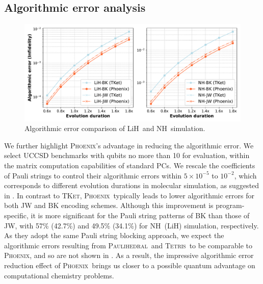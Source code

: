 \documentclass[conference,9pt]{IEEEtran}
\newcommand{\ZY}[1]{{\color{purple}[ZY: #1]}}
\newcommand{\phoenix}{\textsc{Phoenix}}
\newcommand{\tket}{\textsc{TKet}}
\newcommand{\tetris}{\textsc{Tetris}}
\newcommand{\paulihedral}{\textsc{Paulihedral}}
\newcommand{\LiH}{LiH}
\newcommand{\NH}{NH}
\begin{document}
\subsection{Algorithmic error analysis}


    \begin{figure}[tbp]
        \centering
        \includegraphics[width=\columnwidth]{figures/algo_err.pdf}
        \caption{Algorithmic error comparison of \LiH\ and \NH\ simulation.  }
        \label{fig:algo-err}
    \end{figure}

    We further highlight \phoenix's advantage in reducing the algorithmic error. We select UCCSD benchmarks with qubits no more than 10 for evaluation, within the matrix computation capabilities of standard PCs. We rescale the coefficients of Pauli strings to control their algorithmic errors within $5\times 10^{-5}$ to $10^{-2}$, which corresponds to different evolution durations in molecular simulation, as suggested in . In contrast to \tket, \phoenix\ typically leads to lower algorithmic errors for both JW and BK encoding schemes. Although this improvement is program-specific, it is more significant for the Pauli string patterns of BK than those of JW, with 57\% (42.7\%) and 49.5\% (34.1\%) for \NH\ (\LiH) simulation, respectively. As they adopt the same Pauli string blocking approach, we expect the algorithmic errors resulting from \paulihedral\ and \tetris\ to be comparable to \phoenix, and so are not shown in . As a result, the impressive algorithmic error reduction effect of \phoenix\ brings us closer to a possible quantum advantage on computational chemistry problems.




\end{document}

